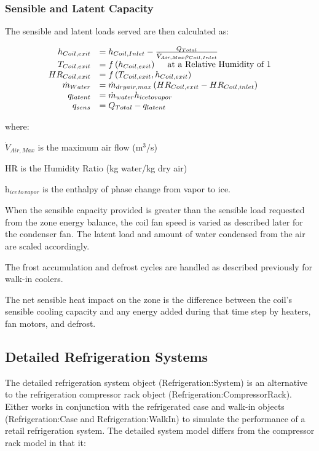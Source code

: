 \subsubsection{Sensible and Latent Capacity}\label{sensible-and-latent-capacity}

The sensible and latent loads served are then calculated as:

\begin{equation}
  \begin{array}{rl}
      h_{Coil,exit} &= h_{Coil,Inlet} - \frac{Q_{Total}}{\dot{V}_{Air,Max} \rho_{Coil,Inlet}} \\
      T_{Coil,exit} &= f\left(h_{Coil,exit}\right)~~~~\text{at a Relative Humidity of 1} \\
     HR_{Coil,exit} &= f\left(T_{Coil,exit},h_{Coil,exit}\right) \\
    \dot{m}_{Water} &= \dot{m}_{dryair,max} \left(HR_{Coil,exit} - HR_{Coil,inlet}\right) \\
         q_{latent} &= \dot{m}_{water} h_{icetovapor} \\
           q_{sens} &= Q_{Total} - q_{latent}
  \end{array}
\end{equation}

where:

\({\dot V_{Air,Max}}\) is the maximum air flow (m\(^{3}\)/s)

HR is the Humidity Ratio (kg water/kg dry air)

h\(_{ice\, to\, vapor}\) is the enthalpy of phase change from vapor to ice.

When the sensible capacity provided is greater than the sensible load requested from the zone energy balance, the coil fan speed is varied as described later for the condenser fan. The latent load and amount of water condensed from the air are scaled accordingly.

The frost accumulation and defrost cycles are handled as described previously for walk-in coolers.

The net sensible heat impact on the zone is the difference between the coil's sensible cooling capacity and any energy added during that time step by heaters, fan motors, and defrost.

\subsection{Detailed Refrigeration Systems}\label{detailed-refrigeration-systems}

The detailed refrigeration system object (Refrigeration:System) is an alternative to the refrigeration compressor rack object (Refrigeration:CompressorRack). Either works in conjunction with the refrigerated case and walk-in objects (Refrigeration:Case and Refrigeration:WalkIn) to simulate the performance of a retail refrigeration system. The detailed system model differs from the compressor rack model in that it:

